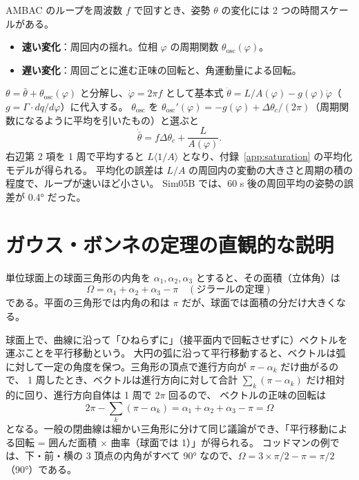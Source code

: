 AMBAC のループを周波数 $f$ で回すとき、姿勢 $\theta$ の変化には 2 つの時間スケールがある。
\begin{itemize}
\item \textbf{速い変化}：周回内の揺れ。位相 $\varphi$ の周期関数 $\theta_{\mathrm{osc}}(\varphi)$。
\item \textbf{遅い変化}：周回ごとに進む正味の回転と、角運動量による回転。
\end{itemize}
$\theta = \bar\theta + \theta_{\mathrm{osc}}(\varphi)$ と分解し、$\dot\varphi = 2\pi f$ として基本式 $\dot\theta = L/A(\varphi) - g(\varphi)\dot\varphi$（$g=\Gamma\cdot dq/d\varphi$）に代入する。
$\theta_{\mathrm{osc}}$ を $\theta_{\mathrm{osc}}'(\varphi) = -g(\varphi) + \Delta\theta_c/(2\pi)$（周期関数になるように平均を引いたもの）と選ぶと
\begin{equation}
\dot{\bar\theta} = f\Delta\theta_c + \frac{L}{A(\varphi)} .
\end{equation}
右辺第 2 項を 1 周で平均すると $L\langle1/A\rangle$ となり、付録~\ref{app:saturation} の平均化モデルが得られる。
平均化の誤差は $L/A$ の周回内の変動の大きさと周期の積の程度で、ループが速いほど小さい。
Sim05B では、60 s 後の周回平均の姿勢の誤差が 0.4° だった。

\section{ガウス・ボンネの定理の直観的な説明}

単位球面上の球面三角形の内角を $\alpha_1,\alpha_2,\alpha_3$ とすると、その面積（立体角）は
\begin{equation}
\Omega = \alpha_1+\alpha_2+\alpha_3-\pi \quad(\text{ジラールの定理})
\end{equation}
である。平面の三角形では内角の和は $\pi$ だが、球面では面積の分だけ大きくなる。

球面上で、曲線に沿って「ひねらずに」（接平面内で回転させずに）ベクトルを運ぶことを平行移動という。
大円の弧に沿って平行移動すると、ベクトルは弧に対して一定の角度を保つ。三角形の頂点で進行方向が $\pi-\alpha_k$ だけ曲がるので、
1 周したとき、ベクトルは進行方向に対して合計 $\sum_k(\pi-\alpha_k)$ だけ相対的に回り、進行方向自体は 1 周で $2\pi$ 回るので、
ベクトルの正味の回転は
\begin{equation}
2\pi - \sum_k(\pi-\alpha_k) = \alpha_1+\alpha_2+\alpha_3-\pi = \Omega
\end{equation}
となる。一般の閉曲線は細かい三角形に分けて同じ議論ができ、「平行移動による回転 = 囲んだ面積 × 曲率（球面では 1）」が得られる。
コッドマンの例では、下・前・横の 3 頂点の内角がすべて 90° なので、$\Omega = 3\times\pi/2-\pi = \pi/2$（90°）である。

